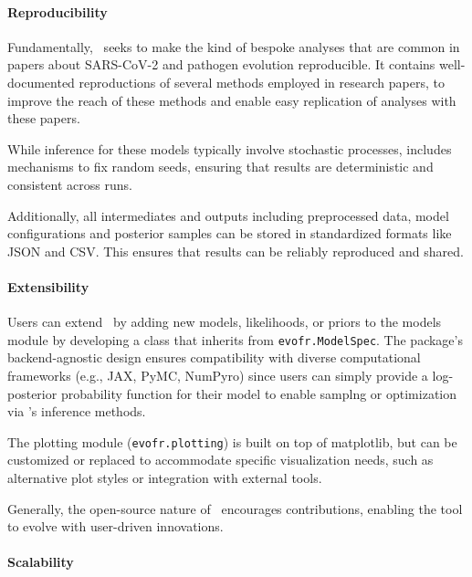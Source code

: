\paragraph{Reproducibility}

Fundamentally, \evofr\ seeks to make the kind of bespoke analyses that are common in papers about SARS-CoV-2 and pathogen evolution reproducible.
It contains well-documented reproductions of several methods employed in research papers, to improve the reach of these methods and enable easy replication of analyses with these papers.

While inference for these models typically involve stochastic processes, \evofr includes mechanisms to fix random seeds, ensuring that results are deterministic and consistent across runs.

Additionally, all intermediates and outputs including preprocessed data, model configurations and posterior samples can be stored in standardized formats like JSON and CSV.
This ensures that results can be reliably reproduced and shared.

\paragraph{Extensibility}

Users can extend \evofr\ by adding new models, likelihoods, or priors to the models module by developing a class that inherits from \texttt{evofr.ModelSpec}.
The package’s backend-agnostic design ensures compatibility with diverse computational frameworks (e.g., JAX, PyMC, NumPyro) since users can simply provide a log-posterior probability function for their model to enable samplng or optimization via \evofr's inference methods. \cite{jax2018github, AbrilPla2023, phan2019composable}

The plotting module (\texttt{evofr.plotting}) is built on top of matplotlib, but can be customized or replaced to accommodate specific visualization needs, such as alternative plot styles or integration with external tools. \cite{Hunter2007}

Generally, the open-source nature of \evofr\ encourages contributions, enabling the tool to evolve with user-driven innovations.

\paragraph{Scalability}

